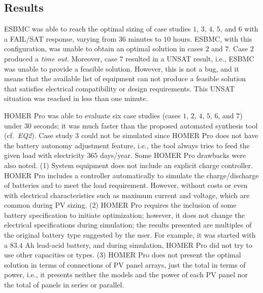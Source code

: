 \documentclass[journal]{IEEEtran}
\begin{document}
\subsection{Results}  
ESBMC was able to reach the optimal sizing of case studies $1$, $3$, $4$, $5$, and $6$ with a FAIL/SAT response, varying from $36$ minutes to $10$ hours. ESBMC, with this configuration, was unable to obtain an optimal solution in cases $2$ and $7$. Case $2$ produced a \textit{time out}. Moreover, case $7$ resulted in a UNSAT result, i.e., ESBMC was unable to provide a feasible solution. However, this is not a bug, and it means that the available list of equipment can not produce a feasible solution that satisfies electrical compatibility or design requirements. This UNSAT situation was reached in less than one minute. %

HOMER Pro was able to evaluate six case studies (cases $1$, $2$, $4$, $5$, $6$, and $7$) under $30$ seconds; it was much faster than the proposed automated synthesis tool (cf.~\textit{EQ2}). Case study $3$ could not be simulated since HOMER Pro does not have the battery autonomy adjustment feature, i.e., the tool always tries to feed the given load with electricity $365$ days/year. Some HOMER Pro drawbacks were also noted. (1) System equipment does not include an explicit charge controller. HOMER Pro includes a controller automatically to simulate the charge/discharge of batteries and to meet the load requirement. However, without costs or even with electrical characteristics such as maximum current and voltage, which are common during PV sizing. (2) HOMER Pro requires the inclusion of some battery specification to initiate optimization; however, it does not change the electrical specifications during simulation; the results presented are multiples of the original battery type suggested by the user. For example, it was started with a $83.4$ Ah lead-acid battery, and during simulation, HOMER Pro did not try to use other capacities or types. (3) HOMER Pro does not present the optimal solution in terms of connections of PV panel arrays, just the total in terms of power, i.e., it presents neither the models and the power of each PV panel nor the total of panels in series or parallel.
\end{document}
